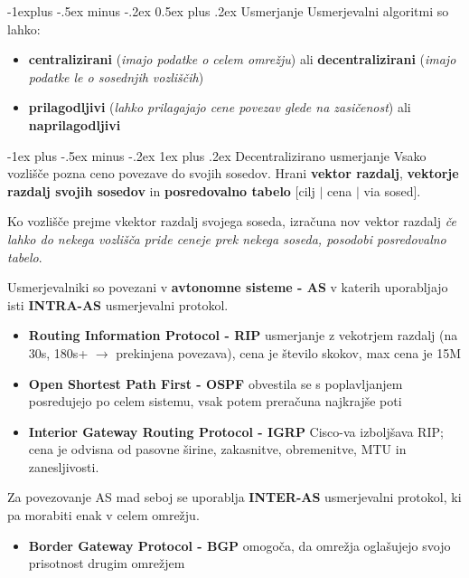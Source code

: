 \documentclass[a4paper,8pt]{extarticle}
\makeatletter
\renewcommand{\subsection}{\@startsection{subsection}{2}{0mm}%
                                {-1explus -.5ex minus -.2ex}%
                                {0.5ex plus .2ex}%
                                {\normalfont\normalsize\bfseries}}
\renewcommand{\subsubsection}{\@startsection{subsubsection}{3}{0mm}%
                                {-1ex plus -.5ex minus -.2ex}%
                                {1ex plus .2ex}%
                                {\normalfont\small\bfseries}}
\makeatother
\begin{document}
\begin{multicols}{4}
\subsection{Usmerjanje}
Usmerjevalni algoritmi so lahko: 
\begin{itemize}
	\item \textbf{centralizirani} (\emph{imajo podatke o celem omrežju}) ali \textbf{decentralizirani} (\emph{imajo podatke le o sosednjih vozliščih}) \\
	\item \textbf{prilagodljivi} (\emph{lahko prilagajajo cene povezav glede na zasičenost}) ali \textbf{naprilagodljivi}
\end{itemize}

\subsubsection{Decentralizirano usmerjanje}
Vsako vozlišče pozna ceno povezave do svojih sosedov. Hrani \textbf{vektor razdalj}, \textbf{vektorje razdalj svojih sosedov} in \textbf{posredovalno tabelo} [cilj $\vert$ cena $\vert$ via sosed].

Ko vozlišče prejme vkektor razdalj svojega soseda, izračuna nov vektor razdalj \emph{če lahko do nekega vozlišča pride ceneje prek nekega soseda, posodobi posredovalno tabelo}.

Usmerjevalniki so povezani v \textbf{avtonomne sisteme - AS} v katerih uporabljajo isti \textbf{INTRA-AS} usmerjevalni protokol.
\begin{itemize}
	\item \textbf{Routing Information Protocol - RIP} usmerjanje z vekotrjem razdalj (na 30s, 180s+ $\rightarrow$ prekinjena povezava), cena je število skokov, max cena je 15M
	\item \textbf{Open Shortest Path First - OSPF} obvestila se s poplavljanjem posredujejo po celem sistemu, vsak potem preračuna najkrajše poti
	\item \textbf{Interior Gateway Routing Protocol - IGRP} Cisco-va izboljšava RIP; cena je odvisna od pasovne širine, zakasnitve, obremenitve, MTU in zanesljivosti.
\end{itemize}

Za povezovanje AS mad seboj se uporablja \textbf{INTER-AS} usmerjevalni protokol, ki pa morabiti enak v celem omrežju.
\begin{itemize}
	\item \textbf{Border Gateway Protocol - BGP} omogoča, da omrežja oglašujejo svojo prisotnost drugim omrežjem
\end{itemize}



\end{multicols}
\end{document}
